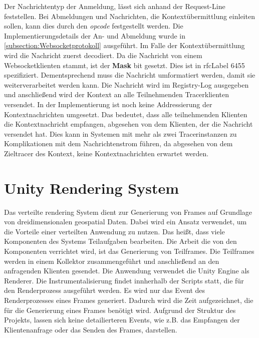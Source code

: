 Der Nachrichtentyp der Anmeldung, lässt sich anhand der Request-Line feststellen. 
Bei Abmeldungen und Nachrichten, die Kontextübermittlung einleiten sollen, kann dies durch den \emph{opcode} festgestellt werden.
Die Implementierungsdetails der An- und Abmeldung wurde in \cref{subsection:Websocketprotokoll} ausgeführt. 
Im Falle der Kontextübermittlung wird die Nachricht zuerst decodiert. 
Da die Nachricht von einem Websocketklienten stammt, ist der \textbf{Mask} bit gesetzt. 
Dies ist in \gls{rfcLabel} 6455 spezifiziert. 
Dementsprechend muss die Nachricht umformatiert werden, damit sie weiterverarbeitet werden kann. Die Nachricht wird im Registry-Log ausgegeben und anschließend wird der Kontext an alle Teilnehmenden Tracerklienten versendet. In der Implementierung ist noch keine Addressierung der Kontextnachrichten umgesetzt. Das bedeutet, dass alle teilnehmenden Klienten die Kontextnachricht empfangen, abgesehen von dem Klienten, der die Nachricht versendet hat. Dies kann in Systemen mit mehr als zwei Tracerinstanzen zu Komplikationen mit dem Nachrichtenstrom führen, da abgesehen von dem Zieltracer des Kontext, keine Kontextnachrichten erwartet werden.


\section{Unity Rendering System}
\label{section:Unity Rendering System}

Das verteilte rendering System dient zur Generierung von Frames auf Grundlage von dreidimensionalen geospatial Daten. Dabei wird ein Ansatz verwendet, um die Vorteile einer verteilten Anwendung zu nutzen. Das heißt, dass viele Komponenten des Systems Teilaufgaben bearbeiten. Die Arbeit die von den Komponenten verrichtet wird, ist das Generierung von Teilframes. Die Teilframes werden in einem Kollektor zusammengeführt und anschließend an den anfragenden Klienten gesendet. Die Anwendung verwendet die Unity Engine als Renderer. Die Instrumentalisierung findet innherhalb der Scripts statt, die für den Renderprozess ausgeführt werden. Es wird nur das Event des Renderprozesses eines Frames generiert. Dadurch wird die Zeit aufgezeichnet, die für die Generierung eines Frames benötigt wird. Aufgrund der Struktur des Projekts, lassen sich keine detailierteren Events, wie z.B. das Empfangen der Klientenanfrage oder das Senden des Frames, darstellen. 

